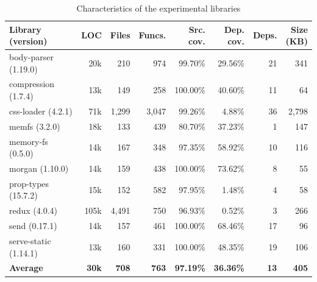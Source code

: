 \begin{table}[htbp]
\centering
\caption{Characteristics of the experimental libraries}
\label{tab:dataset}
\footnotesize
\setlength{\tabcolsep}{3.3pt}
\renewcommand{\arraystretch}{1.10}
\begin{tabular*}{1.0\linewidth}{@{\extracolsep{\fill}}lrrrrrrr@{}}
\toprule
Library (version) & LOC & Files & Funcs. & \makecell[r]{Src.\\cov.} & \makecell[r]{Dep.\\cov.} & Deps. & \makecell[r]{Size\\(KB)} \\
\midrule
body-parser (1.19.0) & 20k & 210 & 974 & 99.70\% & 29.56\% & 21 & 341 \\
compression (1.7.4) & 13k & 149 & 258 & 100.00\% & 40.60\% & 11 & 64 \\
css-loader (4.2.1) & 71k & 1,299 & 3,047 & 99.26\% & 4.88\% & 36 & 2,798 \\
memfs (3.2.0) & 18k & 133 & 439 & 80.70\% & 37.23\% & 1 & 147 \\
memory-fs (0.5.0) & 14k & 167 & 348 & 97.35\% & 58.92\% & 10 & 116 \\
morgan (1.10.0) & 14k & 159 & 438 & 100.00\% & 73.62\% & 8 & 55 \\
prop-types (15.7.2) & 15k & 152 & 582 & 97.95\% & 1.48\% & 4 & 58 \\
redux (4.0.4) & 105k & 4,491 & 750 & 96.93\% & 0.52\% & 3 & 266 \\
send (0.17.1) & 14k & 157 & 461 & 100.00\% & 68.46\% & 17 & 96 \\
serve-static (1.14.1) & 13k & 160 & 331 & 100.00\% & 48.35\% & 19 & 106 \\
\midrule
\textbf{Average} & \textbf{30k} & \textbf{708} & \textbf{763} & \textbf{97.19\%} & \textbf{36.36\%} & \textbf{13} & \textbf{405} \\
\bottomrule
\end{tabular*}
\end{table}
